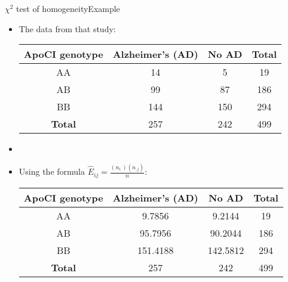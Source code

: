 \documentclass[xcolor=dvipsnames]{beamer}
\begin{document}
\begin{frame}{$\chi^2$ test of homogeneity}{Example}
\begin{itemize}
	\item The data from that study:
	\begin{center}
		\begin{tabular}{c|cc|c}
			\hline
			\textbf{ApoCI genotype} & \textbf{Alzheimer's (AD)} & \textbf{No AD} & \textbf{Total} \\ \hline
			AA & 14 & 5 &  19\\
			AB & 99 & 87 &  186\\
			BB & 144 & 150 &  294\\ \hline
			\textbf{Total} & 257 & 242 & 499
		\end{tabular}
	\end{center}
	\item[]
	\item Using the formula $\hat{E}_{ij} = \frac{(n_{i.})(n_{.j})}{n}$:
	\begin{center}
	\begin{tabular}{c|cc|c}
		\hline
		\textbf{ApoCI genotype} & \textbf{Alzheimer's (AD)} & \textbf{No AD} & \textbf{Total}\\ \hline
		AA &   9.7856 &   9.2144 & 19\\
		AB &  95.7956&   90.2044 & 186\\
		BB & 151.4188 & 142.5812 & 294\\ \hline
		\textbf{Total} & 257 & 242 & 499
	\end{tabular}
\end{center}
\end{itemize}
\end{frame}
\end{document}
